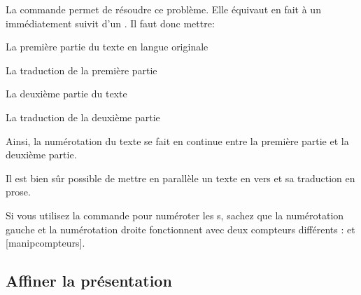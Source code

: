 La commande  permet de résoudre ce problème. Elle équivaut en fait à un  immédiatement suivit d'un . Il faut donc mettre: 

\begin{latexcode}
\begin{pages}  
\begin{Leftside}  \beginnumbering 
La première partie du texte en langue originale
\end{Leftside} %
 
\begin{Rightside} \beginnumbering
La traduction de la première partie
\end{Rightside} %
\Pages
 
\begin{Leftside} \memorydump %
La deuxième partie du texte 
\endnumbering  \end{Leftside}
    
\begin{Rightside}  \memorydump %
La traduction de la deuxième partie
\endnumbering \end{Rightside}   %
 
 \Pages

\end{pages}
\end{latexcode}

Ainsi, la numérotation du texte se fait en continue entre la première partie et la deuxième partie.


\begin{plusloins}
Il est bien sûr possible de mettre en parallèle un texte en vers et sa traduction en prose. 
\end{plusloins}
\begin{plusloins}
Si vous utilisez la commande  pour numéroter les s, sachez que la numérotation gauche et la numérotation droite fonctionnent avec deux compteurs différents :  et [manipcompteurs].
\end{plusloins}




\subsection{Affiner la présentation}


